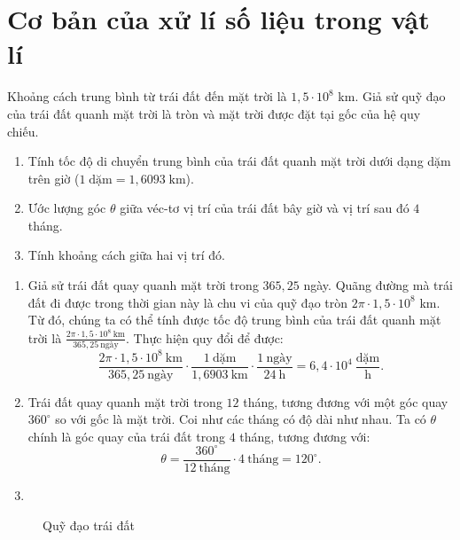 \documentclass[a4paper, titlepage, openany]{book}
\newcounter{exercise}
\newcounter{solution}
\numberwithin{equation}{chapter}
\def \pointSize {2pt}
\begin{document}
\chapter{Cơ bản của xử lí số liệu trong vật lí}
\exercise Khoảng cách trung bình từ trái đất đến mặt trời là $1{,}5 \cdot 10^8$ km. Giả sử quỹ đạo của trái đất quanh mặt trời là tròn và mặt trời được đặt tại gốc của hệ quy chiếu.
\begin{enumerate}
   \item Tính tốc độ di chuyển trung bình của trái đất quanh mặt trời dưới dạng dặm trên giờ ($1 \;\text{dặm}=1{,}6093\;\text{km}$).
   \item Ước lượng góc $\theta$ giữa véc-tơ vị trí của trái đất bây giờ và vị trí sau đó $4$ tháng.
   \item Tính khoảng cách giữa hai vị trí đó.
\end{enumerate}
\solution
\begin{enumerate}
   \item Giả sử trái đất quay quanh mặt trời trong $365{,}25$ ngày. Quãng đường mà trái đất đi được trong thời gian này là chu vi của quỹ đạo tròn $2 \pi \cdot 1{,}5 \cdot 10^8$ km. Từ đó, chúng ta có thể tính được tốc độ trung bình của trái đất quanh mặt trời là $\frac{2 \pi \cdot 1{,}5 \cdot 10^8\ \text{km}}{365{,}25\ \text{ngày}}$. Thực hiện quy đổi để được:
      \[
         \frac{2 \pi \cdot 1{,}5 \cdot 10^8\ \text{km}}{365{,}25\ \text{ngày}}
         \cdot \frac{1\ \text{dặm}}{1{,}6903\ \text{km}}
         \cdot \frac{1\ \text{ngày}}{24\ \text{h}}
         = \boxed{6{,}4\cdot 10^4\ \frac{\text{dặm}}{\text{h}}}.
      \]
   \item Trái đất quay quanh mặt trời trong $12$ tháng, tương đương với một góc quay $360^{\circ}$ so với gốc là mặt trời. Coi như các tháng có độ dài như nhau. Ta có $\theta$ chính là góc quay của trái đất trong $4$ tháng, tương đương với:
   \[
      \theta = \frac{360^{\circ}}{12\ \text{tháng}} \cdot 4\ \text{tháng}= \boxed{120^{\circ}}.
   \]
   \item
\end{enumerate}

\begin{wrapfigure}{R}{0.3\textwidth}
   \centering
   \caption{Quỹ đạo trái đất}
   \label{fig:earth}
\end{wrapfigure}
\end{document}
